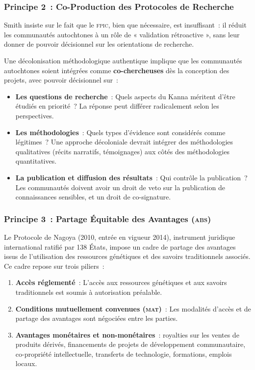 \documentclass[12pt,a4paper,twoside]{book}
\newcommand{\fpic}{\textsc{fpic}}
\begin{document}
\subsubsection{Principe 2~: Co-Production des Protocoles de Recherche}

Smith insiste sur le fait que le \fpic{}, bien que nécessaire, est insuffisant~: il réduit les communautés autochtones à un rôle de « validation rétroactive », sans leur donner de pouvoir décisionnel sur les orientations de recherche.

Une décolonisation méthodologique authentique implique que les communautés autochtones soient intégrées comme \textbf{co-chercheuses} dès la conception des projets, avec pouvoir décisionnel sur~:

\begin{itemize}
\item \textbf{Les questions de recherche}~: Quels aspects du Kanna méritent d'être étudiés en priorité~? La réponse peut différer radicalement selon les perspectives.

\item \textbf{Les méthodologies}~: Quels types d'évidence sont considérés comme légitimes~? Une approche décoloniale devrait intégrer des méthodologies qualitatives (récits narratifs, témoignages) aux côtés des méthodologies quantitatives.

\item \textbf{La publication et diffusion des résultats}~: Qui contrôle la publication~? Les communautés doivent avoir un droit de veto sur la publication de connaissances sensibles, et un droit de co-signature.
\end{itemize}

\subsubsection{Principe 3~: Partage Équitable des Avantages (\textsc{abs})}

Le Protocole de Nagoya (2010, entrée en vigueur 2014), instrument juridique international ratifié par 138 États, impose un cadre de partage des avantages issus de l'utilisation des ressources génétiques et des savoirs traditionnels associés. Ce cadre repose sur trois piliers~:

\begin{enumerate}
\item \textbf{Accès réglementé}~: L'accès aux ressources génétiques et aux savoirs traditionnels est soumis à autorisation préalable.

\item \textbf{Conditions mutuellement convenues (\textsc{mat})}~: Les modalités d'accès et de partage des avantages sont négociées entre les parties.

\item \textbf{Avantages monétaires et non-monétaires}~: royalties sur les ventes de produits dérivés, financements de projets de développement communautaire, co-propriété intellectuelle, transferts de technologie, formations, emplois locaux.
\end{enumerate}
\end{document}
